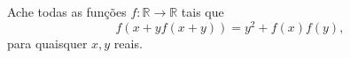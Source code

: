 Ache todas as funções $f:\mathbb{R}\rightarrow\mathbb{R}$ tais que
$$f\left(x+yf(x+y)\right)=y^2+f(x)f(y),$$
para quaisquer $x, y$ reais.
